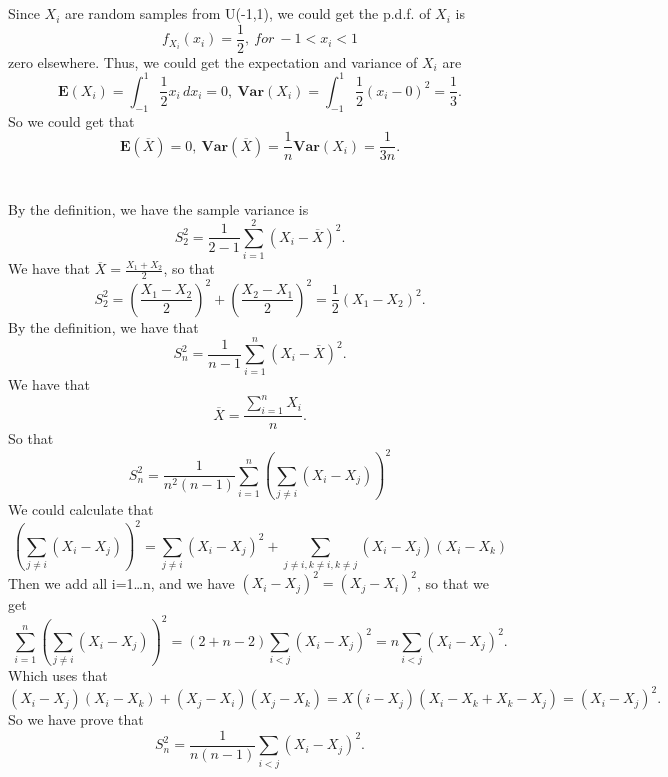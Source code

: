 \documentclass[10.5pt]{article}
\begin{document}
\section{}
Since $X_i$ are random samples from U(-1,1), we could get the p.d.f. of $X_i$ is $$f_{X_i}(x_i)=\frac{1}{2},~for ~-1<x_i<1$$\indent
zero elsewhere. Thus, we could get the expectation and variance of $X_i$ are $$\mathbf{E}(X_i)=\int_{-1}^1\frac{1}{2}x_i\,dx_i=0,~\mathbf{Var}(X_i)=\int_{-1}^1\frac{1}{2}(x_i-0)^2=\frac{1}{3}.$$\indent
So we could get that $$\mathbf{E}(\overline{X})=0,~\mathbf{Var}(\overline{X})=\frac{1}{n}\mathbf{Var}(X_i)=\frac{1}{3n}.$$

\section{}
By the definition, we have the sample variance is $$S_2^2=\frac{1}{2-1}\sum_{i=1}^2(X_i-\overline{X})^2.$$\indent
We have that $\overline{X}=\frac{X_1+X_2}{2}$, so that $$S_2^2=(\frac{X_1-X_2}{2})^2+(\frac{X_2-X_1}{2})^2=\frac{1}{2}(X_1-X_2)^2.$$\indent
By the definition, we have that $$S_n^2=\frac{1}{n-1}\sum_{i=1}^n(X_i-\overline{X})^2.$$\indent
We have that $$\overline{X}=\frac{\sum_{i=1}^nX_i}{n}.$$\indent
So that $$S_n^2=\frac{1}{n^2(n-1)}\sum_{i=1}^n\left(\sum_{j\neq i}(X_i-X_j)\right)^2$$\indent
We could calculate that $$\left(\sum_{j\neq i}(X_i-X_j)\right)^2=\sum_{j\neq i}(X_i-X_j)^2+\sum_{j\neq i,k\neq i,k\neq j}(X_i-X_j)(X_i-X_k)$$\indent
Then we add all i=1\dots n, and we have $(X_i-X_j)^2=(X_j-X_i)^2$, so that we get $$\sum_{i=1}^n\left(\sum_{j\neq i}(X_i-X_j)\right)^2=(2+n-2)\sum_{i<j}(X_i-X_j)^2=n\sum_{i<j}(X_i-X_j)^2.$$\indent
Which uses that $$(X_i-X_j)(X_i-X_k)+(X_j-X_i)(X_j-X_k)=X(i-X_j)(X_i-X_k+X_k-X_j)=(X_i-X_j)^2.$$\indent
So we have prove that $$S_n^2=\frac{1}{n(n-1)}\sum_{i<j}(X_i-X_j)^2.$$
\end{document}
